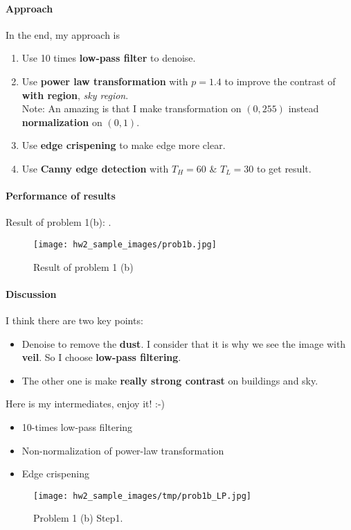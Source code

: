 \paragraph{Approach}
In the end, my approach is
\begin{enumerate}
    \item Use \alert{10 times} \textbf{low-pass filter} to denoise.
    \item Use \textbf{power law transformation} with $p=1.4$ to improve the contrast of \textbf{with region}, \textit{sky region}. \\
    Note: An amazing is that I make transformation on $(0, 255)$ \alert{instead} \textbf{normalization} on $(0, 1)$.
    \item Use \textbf{edge crispening} to make edge more clear.
    \item Use \textbf{Canny edge detection} with $T_{H} = 60$ \& $T_{L}= 30$ to get result.
\end{enumerate}

\paragraph{Performance of results}
Result of problem 1(b): .
\begin{figure}
    \centering
    \texttt{[image: hw2\_sample\_images/prob1b.jpg]}
    \caption{Result of problem 1 (b)}
    \label{result1b}
\end{figure}

\paragraph{Discussion}
I think there are two key points:
\begin{itemize}
    \item Denoise to remove the \textbf{dust}. I consider that it is why we see the image with \textbf{veil}. So I choose \textbf{low-pass filtering}.
    \item The other one is make \textbf{really strong contrast} on buildings and sky.
\end{itemize}
Here is my intermediates, enjoy it! :-)
\begin{itemize}
    \item {} 10-times low-pass filtering
    \item {} Non-normalization of power-law transformation
    \item {} Edge crispening
\end{itemize}
\begin{figure}
    \centering
    \texttt{[image: hw2\_sample\_images/tmp/prob1b\_LP.jpg]}
    \caption{Problem 1 (b) Step1.}
    \label{prob1b_LP}
\end{figure}

